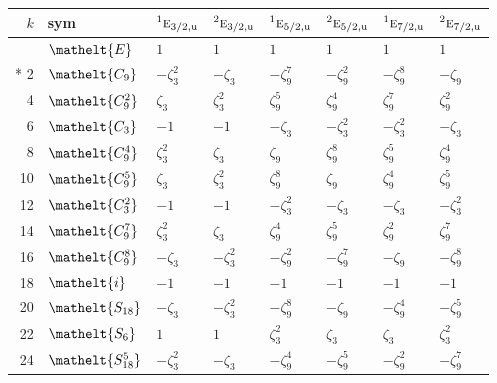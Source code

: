\documentclass[10pt,a4paper]{article}
\numberwithin{equation}{section}
\newcommand{\eltfont}[1]{{\let\sigma\eltsigma\mathelt{#1}}}
\newcommand{\irr}[1]{\text{\normalfont\scshape #1}}
\newcommand{\conjpair}[1]{{}^{#1}}
\newcommand{\cls}[1]{\eltfont{#1}}
\newcommand{\ptag}[1]{\mathrm{#1}}
\newcommand{\rootunity}[1]{\zeta_{#1}}
\begin{document}
{\small\setlength{\tabcolsep}{4pt}
\begin{longtable}{@{}rlllllll@{}}\toprule
$k$ & sym & $\conjpair{1}\irr{e}_{3/2,\ptag{u}}$ & $\conjpair{2}\irr{e}_{3/2,\ptag{u}}$ & $\conjpair{1}\irr{e}_{5/2,\ptag{u}}$ & $\conjpair{2}\irr{e}_{5/2,\ptag{u}}$ & $\conjpair{1}\irr{e}_{7/2,\ptag{u}}$ & $\conjpair{2}\irr{e}_{7/2,\ptag{u}}$\\\midrule\endhead
\bottomrule\endfoot\endlastfoot
0 & $\cls{E}$ & $1$ & $1$ & $1$ & $1$ & $1$ & $1$\\*
2 & $\cls{C_{9}}$ & $-\rootunity{3}^{2}$ & $-\rootunity{3}$ & $-\rootunity{9}^{7}$ & $-\rootunity{9}^{2}$ & $-\rootunity{9}^{8}$ & $-\rootunity{9}$\\
4 & $\cls{C_{9}^{2}}$ & $\rootunity{3}$ & $\rootunity{3}^{2}$ & $\rootunity{9}^{5}$ & $\rootunity{9}^{4}$ & $\rootunity{9}^{7}$ & $\rootunity{9}^{2}$\\
6 & $\cls{C_{3}}$ & $-1$ & $-1$ & $-\rootunity{3}$ & $-\rootunity{3}^{2}$ & $-\rootunity{3}^{2}$ & $-\rootunity{3}$\\
8 & $\cls{C_{9}^{4}}$ & $\rootunity{3}^{2}$ & $\rootunity{3}$ & $\rootunity{9}$ & $\rootunity{9}^{8}$ & $\rootunity{9}^{5}$ & $\rootunity{9}^{4}$\\
10 & $\cls{C_{9}^{5}}$ & $\rootunity{3}$ & $\rootunity{3}^{2}$ & $\rootunity{9}^{8}$ & $\rootunity{9}$ & $\rootunity{9}^{4}$ & $\rootunity{9}^{5}$\\
12 & $\cls{C_{3}^{2}}$ & $-1$ & $-1$ & $-\rootunity{3}^{2}$ & $-\rootunity{3}$ & $-\rootunity{3}$ & $-\rootunity{3}^{2}$\\
14 & $\cls{C_{9}^{7}}$ & $\rootunity{3}^{2}$ & $\rootunity{3}$ & $\rootunity{9}^{4}$ & $\rootunity{9}^{5}$ & $\rootunity{9}^{2}$ & $\rootunity{9}^{7}$\\
16 & $\cls{C_{9}^{8}}$ & $-\rootunity{3}$ & $-\rootunity{3}^{2}$ & $-\rootunity{9}^{2}$ & $-\rootunity{9}^{7}$ & $-\rootunity{9}$ & $-\rootunity{9}^{8}$\\
18 & $\cls{i}$ & $-1$ & $-1$ & $-1$ & $-1$ & $-1$ & $-1$\\
20 & $\cls{S_{18}}$ & $-\rootunity{3}$ & $-\rootunity{3}^{2}$ & $-\rootunity{9}^{8}$ & $-\rootunity{9}$ & $-\rootunity{9}^{4}$ & $-\rootunity{9}^{5}$\\
22 & $\cls{S_{6}}$ & $1$ & $1$ & $\rootunity{3}^{2}$ & $\rootunity{3}$ & $\rootunity{3}$ & $\rootunity{3}^{2}$\\
24 & $\cls{S_{18}^{5}}$ & $-\rootunity{3}^{2}$ & $-\rootunity{3}$ & $-\rootunity{9}^{4}$ & $-\rootunity{9}^{5}$ & $-\rootunity{9}^{2}$ & $-\rootunity{9}^{7}$\\

\end{longtable}}
\end{document}
